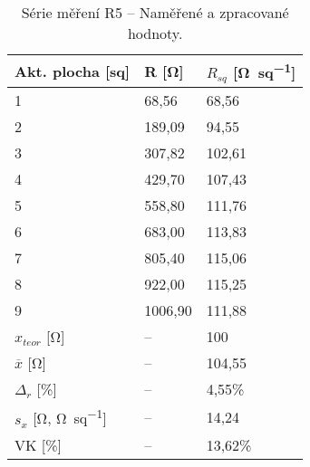 \begin{table}[h!]
    \caption{Série měření R5 -- Naměřené a zpracované hodnoty.}
    \centering
    \def\arraystretch{1.4}
    \begin{tabular}{l|l|l}
        Akt. plocha [sq]                              & R [\unit{\ohm}]    & \(R_{sq}\) [\unit{\ohm\per sq}]  \\ \hline\hline
        1                                             & 68,56   & 68,56 \\ \hline
        2                                             & 189,09  & 94,55 \\ \hline
        3                                             & 307,82  & 102,61 \\ \hline
        4                                             & 429,70  & 107,43 \\ \hline
        5                                             & 558,80  & 111,76 \\ \hline
        6                                             & 683,00  & 113,83 \\ \hline
        7                                             & 805,40  & 115,06 \\ \hline
        8                                             & 922,00  & 115,25 \\ \hline
        9                                             & 1006,90 & 111,88 \\ \hline\hline
        \(x_{teor} \) [\unit{\ohm}]                   & --      & 100    \\ \hline
        \(\overline{x} \) [\unit{\ohm}]               & --      & 104,55 \\ \hline
        \(\Delta_{r} \) [\unit{\percent}]             & --      & 4,55\%\\ \hline\hline
        \(s_{x} \) [\unit{\ohm}, \unit{\ohm\per sq}]  & --      & 14,24   \\ \hline
        VK [\unit{\percent}]                          & --      & 13,62\% \\ 
    \end{tabular}
    \label{tab:r5_hodnoty}
\end{table}

